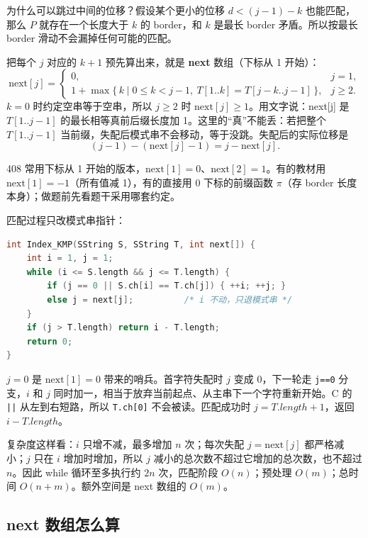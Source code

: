 为什么可以跳过中间的位移？假设某个更小的位移 $d<(j-1)-k$ 也能匹配，那么 $P$ 就存在一个长度大于 $k$ 的 border，和 $k$ 是最长 border 矛盾。所以按最长 border 滑动不会漏掉任何可能的匹配。

把每个 $j$ 对应的 $k+1$ 预先算出来，就是 \textbf{next} 数组（下标从 1 开始）：
\begin{equation}
\mathrm{next}[j]=
\begin{cases}
0, & j=1,\\[2pt]
1+\max\{\,k\mid 0\le k<j-1,\ T[1..k]=T[j-k..j-1]\,\}, & j\ge 2.
\end{cases}
\end{equation}
$k=0$ 时约定空串等于空串，所以 $j\ge2$ 时 $\mathrm{next}[j]\ge1$。用文字说：next[j] 是 $T[1..j-1]$ 的最长相等真前后缀长度加 1。这里的“真”不能丢：若把整个 $T[1..j-1]$ 当前缀，失配后模式串不会移动，等于没跳。失配后的实际位移是
\[
(j-1)-(\mathrm{next}[j]-1)=j-\mathrm{next}[j].
\]

408 常用下标从 1 开始的版本，$\mathrm{next}[1]=0$、$\mathrm{next}[2]=1$。有的教材用 $\mathrm{next}[1]=-1$（所有值减 1），有的直接用 0 下标的前缀函数 $\pi$（存 border 长度本身）；做题前先看题干采用哪套约定。

匹配过程只改模式串指针：
\begin{lstlisting}[language=C]
int Index_KMP(SString S, SString T, int next[]) {
    int i = 1, j = 1;
    while (i <= S.length && j <= T.length) {
        if (j == 0 || S.ch[i] == T.ch[j]) { ++i; ++j; }
        else j = next[j];          /* i 不动，只退模式串 */
    }
    if (j > T.length) return i - T.length;
    return 0;
}
\end{lstlisting}
$j=0$ 是 $\mathrm{next}[1]=0$ 带来的哨兵。首字符失配时 $j$ 变成 0，下一轮走 \texttt{j==0} 分支，$i$ 和 $j$ 同时加一，相当于放弃当前起点、从主串下一个字符重新开始。C 的 \texttt{||} 从左到右短路，所以 \texttt{T.ch[0]} 不会被读。匹配成功时 $j=T.length+1$，返回 $i-T.length$。

复杂度这样看：$i$ 只增不减，最多增加 $n$ 次；每次失配 $j=\mathrm{next}[j]$ 都严格减小；$j$ 只在 $i$ 增加时增加，所以 $j$ 减小的总次数不超过它增加的总次数，也不超过 $n$。因此 while 循环至多执行约 $2n$ 次，匹配阶段 $O(n)$；预处理 $O(m)$；总时间 $O(n+m)$。额外空间是 next 数组的 $O(m)$。

\subsection{next 数组怎么算}

